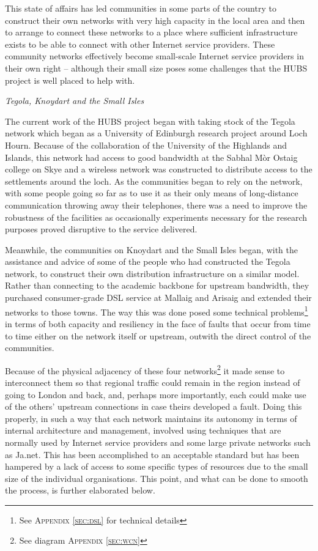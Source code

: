 \documentclass[a4paper,conference,onecolumn]{IEEEtran}
\renewcommand{\subsection}[1]{%
  \vspace{\lineskip}%
  \begin{center}%
    \textit{#1}%
  \end{center}%
  \vspace{\lineskip}%
}
\begin{document}
This state of affairs has led communities in some parts of the
country to construct their own networks with very high capacity in the
local area and then to arrange to connect these networks to a place
where sufficient infrastructure exists to be able to connect with
other Internet service providers. These community networks effectively
become small-scale Internet service providers in their own right --
although their small size poses some challenges that the HUBS project
is well placed to help with.

\subsection{Tegola, Knoydart and the Small Isles}

The current work of the HUBS project began with taking stock of the
Tegola network which began as a University of Edinburgh research
project around Loch Hourn. Because of the collaboration of the
University of the Highlands and Islands, this network had access to
good bandwidth at the Sabhal Mòr Ostaig college on Skye and a wireless
network was constructed to distribute access to the settlements around
the loch. As the communities began to rely on the network, with some
people going so far as to use it as their only means of long-distance
communication throwing away their telephones, there was a need to
improve the robustness of the facilities as occasionally experiments
necessary for the research purposes proved disruptive to the service
delivered. 

Meanwhile, the communities on Knoydart and the Small Isles began, with
the assistance and advice of some of the people who had constructed
the Tegola network, to construct their own distribution
infrastructure on a similar model. Rather than connecting to the
academic backbone for upstream bandwidth, they purchased consumer-grade
DSL service at Mallaig and Arisaig and extended their networks to
those towns. The way this was done posed some technical
problems\footnote{See \textsc{Appendix \ref{sec:dsl}} for technical
  details} in terms of both capacity and resiliency in the face of
faults that occur from time to time either on the network itself or
upstream, outwith the direct control of the communities.

Because of the physical adjacency of these four networks\footnote{See
  diagram \textsc{Appendix \ref{sec:wcn}}} it made sense to interconnect
them so that regional traffic could remain in the region instead of
going to London and back, and, perhaps more importantly, each could
make use of the others' upstream connections in case theirs developed
a fault. Doing this properly, in such a way that each network
maintains its autonomy in terms of internal architecture and
management, involved using techniques that are normally used by
Internet service providers and some large private networks such as
Ja.net. This has been accomplished to an acceptable standard but has
been hampered by a lack of access to some specific types of resources
due to the small size of the individual organisations. This point, and
what can be done to smooth the process, is further elaborated below.
\end{document}
